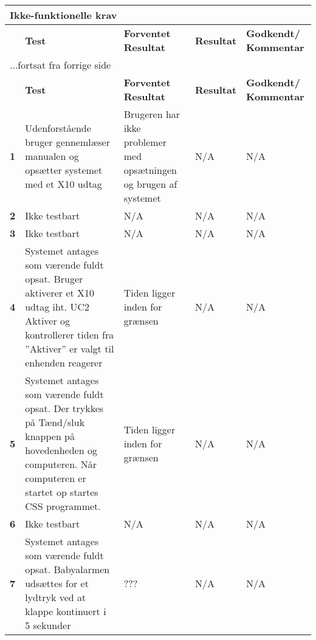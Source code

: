 
\begin{center}
\begin{longtable}{|p{}|p{}|p{}|p{}|p{}|} %
\hline
\multicolumn{5}{|l|}{\textbf{Ikke-funktionelle krav}} \\ \hline
\multicolumn{1}{|c|}{} &
\textbf{Test} &
\textbf{Forventet \newline Resultat} &
\textbf{Resultat} &
\textbf{Godkendt/ \newline Kommentar} \\ \hline 
\endfirsthead

\multicolumn{5}{l}{...fortsat fra forrige side} \\ \hline 
\multicolumn{1}{|c|}{} &
\textbf{Test} &
\textbf{Forventet \newline Resultat} &
\textbf{Resultat} &
\textbf{Godkendt/ \newline Kommentar} \\ \hline 
\endhead


\textbf{1} &
Udenforstående bruger gennemlæser manualen og opsætter systemet med et X10 udtag &
Brugeren har ikke problemer med opsætningen og brugen af systemet &
N/A &
N/A \\\hline

\textbf{2} &
Ikke testbart &
N/A &
N/A &
N/A \\\hline

\textbf{3} &
Ikke testbart &
N/A &
N/A &
N/A \\\hline

\textbf{4} &
Systemet antages som værende fuldt opsat.\newline
Bruger aktiverer et X10 udtag iht. UC2 Aktiver og kontrollerer tiden fra ''Aktiver'' er valgt til enhenden reagerer&
Tiden ligger inden for grænsen &
N/A &
N/A \\\hline

\textbf{5} &
Systemet antages som værende fuldt opsat.\newline
Der trykkes på Tænd/sluk knappen på hovedenheden og computeren. Når computeren er startet op startes CSS programmet. &
Tiden ligger inden for grænsen &
N/A &
N/A \\\hline

\textbf{6} &
Ikke testbart &
N/A  &
N/A &
N/A \\\hline

\textbf{7} &
Systemet antages som værende fuldt opsat.\newline
Babyalarmen udsættes for et lydtryk ved at klappe kontinuert i 5 sekunder &
??? &
N/A &
N/A \\\hline


\end{longtable}
\end{center}
